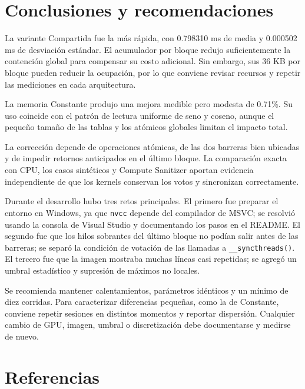 \documentclass[12pt,letterpaper]{article}
\begin{document}
\section{Conclusiones y recomendaciones}

La variante Compartida fue la más rápida, con 0.798310 ms de media y 0.000502 ms de desviación estándar. El acumulador por bloque redujo suficientemente la contención global para compensar su costo adicional. Sin embargo, sus 36 KB por bloque pueden reducir la ocupación, por lo que conviene revisar recursos y repetir las mediciones en cada arquitectura.

La memoria Constante produjo una mejora medible pero modesta de 0.71\%. Su uso coincide con el patrón de lectura uniforme de seno y coseno, aunque el pequeño tamaño de las tablas y los atómicos globales limitan el impacto total.

La corrección depende de operaciones atómicas, de las dos barreras bien ubicadas y de impedir retornos anticipados en el último bloque. La comparación exacta con CPU, los casos sintéticos y Compute Sanitizer aportan evidencia independiente de que los kernels conservan los votos y sincronizan correctamente.

Durante el desarrollo hubo tres retos principales. El primero fue preparar el entorno en Windows, ya que \texttt{nvcc} depende del compilador de MSVC; se resolvió usando la consola de Visual Studio y documentando los pasos en el README. El segundo fue que los hilos sobrantes del último bloque no podían salir antes de las barreras; se separó la condición de votación de las llamadas a \texttt{\_\_syncthreads()}. El tercero fue que la imagen mostraba muchas líneas casi repetidas; se agregó un umbral estadístico y supresión de máximos no locales.

Se recomienda mantener calentamientos, parámetros idénticos y un mínimo de diez corridas. Para caracterizar diferencias pequeñas, como la de Constante, conviene repetir sesiones en distintos momentos y reportar dispersión. Cualquier cambio de GPU, imagen, umbral o discretización debe documentarse y medirse de nuevo.

\clearpage
\section{Referencias}
\end{document}
